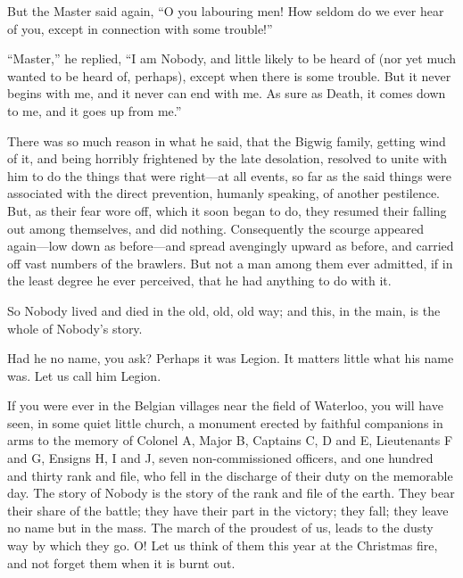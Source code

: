 But the Master said again, ``O you labouring men!  How seldom do we
ever hear of you, except in connection with some trouble!''

``Master,'' he replied, ``I am Nobody, and little likely to be heard of
(nor yet much wanted to be heard of, perhaps), except when there is
some trouble.  But it never begins with me, and it never can end
with me.  As sure as Death, it comes down to me, and it goes up from
me.''

There was so much reason in what he said, that the Bigwig family,
getting wind of it, and being horribly frightened by the late
desolation, resolved to unite with him to do the things that were
right---at all events, so far as the said things were associated with
the direct prevention, humanly speaking, of another pestilence.
But, as their fear wore off, which it soon began to do, they resumed
their falling out among themselves, and did nothing.  Consequently
the scourge appeared again---low down as before---and spread
avengingly upward as before, and carried off vast numbers of the
brawlers.  But not a man among them ever admitted, if in the least
degree he ever perceived, that he had anything to do with it.

So Nobody lived and died in the old, old, old way; and this, in the
main, is the whole of Nobody's story.

Had he no name, you ask?  Perhaps it was Legion.  It matters little
what his name was.  Let us call him Legion.

If you were ever in the Belgian villages near the field of Waterloo,
you will have seen, in some quiet little church, a monument erected
by faithful companions in arms to the memory of Colonel A, Major B,
Captains C, D and E, Lieutenants F and G, Ensigns H, I and J, seven
non-commissioned officers, and one hundred and thirty rank and file,
who fell in the discharge of their duty on the memorable day.  The
story of Nobody is the story of the rank and file of the earth.
They bear their share of the battle; they have their part in the
victory; they fall; they leave no name but in the mass.  The march
of the proudest of us, leads to the dusty way by which they go.  O!
Let us think of them this year at the Christmas fire, and not forget
them when it is burnt out.





% 
